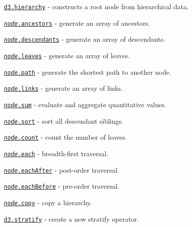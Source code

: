 \begin{DoxyItemize}
\item \href{https://github.com/d3/d3-hierarchy/blob/master/README.md#hierarchy}{\tt d3.\+hierarchy} -\/ constructs a root node from hierarchical data.
\item \href{https://github.com/d3/d3-hierarchy/blob/master/README.md#node_ancestors}{\tt {\itshape node}.ancestors} -\/ generate an array of ancestors.
\item \href{https://github.com/d3/d3-hierarchy/blob/master/README.md#node_descendants}{\tt {\itshape node}.descendants} -\/ generate an array of descendants.
\item \href{https://github.com/d3/d3-hierarchy/blob/master/README.md#node_leaves}{\tt {\itshape node}.leaves} -\/ generate an array of leaves.
\item \href{https://github.com/d3/d3-hierarchy/blob/master/README.md#node_path}{\tt {\itshape node}.path} -\/ generate the shortest path to another node.
\item \href{https://github.com/d3/d3-hierarchy/blob/master/README.md#node_links}{\tt {\itshape node}.links} -\/ generate an array of links.
\item \href{https://github.com/d3/d3-hierarchy/blob/master/README.md#node_sum}{\tt {\itshape node}.sum} -\/ evaluate and aggregate quantitative values.
\item \href{https://github.com/d3/d3-hierarchy/blob/master/README.md#node_sort}{\tt {\itshape node}.sort} -\/ sort all descendant siblings.
\item \href{https://github.com/d3/d3-hierarchy/blob/master/README.md#node_count}{\tt {\itshape node}.count} -\/ count the number of leaves.
\item \href{https://github.com/d3/d3-hierarchy/blob/master/README.md#node_each}{\tt {\itshape node}.each} -\/ breadth-\/first traversal.
\item \href{https://github.com/d3/d3-hierarchy/blob/master/README.md#node_eachAfter}{\tt {\itshape node}.each\+After} -\/ post-\/order traversal.
\item \href{https://github.com/d3/d3-hierarchy/blob/master/README.md#node_eachBefore}{\tt {\itshape node}.each\+Before} -\/ pre-\/order traversal.
\item \href{https://github.com/d3/d3-hierarchy/blob/master/README.md#node_copy}{\tt {\itshape node}.copy} -\/ copy a hierarchy.
\item \href{https://github.com/d3/d3-hierarchy/blob/master/README.md#stratify}{\tt d3.\+stratify} -\/ create a new stratify operator.

\end{DoxyItemize}
